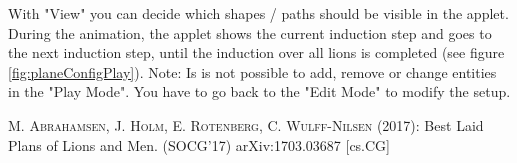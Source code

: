 \documentclass[a4paper]{article}
\begin{document}
With "View" you can decide which shapes / paths should be visible in the applet. During the animation, the applet shows the current induction step and goes to the next induction step, until the induction over all lions is completed (see figure \ref{fig:planeConfigPlay}). Note: Is is not possible to add, remove or change entities in the "Play Mode". You have to go back to the "Edit Mode" to modify the setup.



\newpage
	\begin{thebibliography}{99}
		
		
		 \textsc{M. Abrahamsen, J. Holm, E. Rotenberg, C. Wulff-Nilsen} (2017): Best Laid Plans of Lions and Men. (SOCG'17) arXiv:1703.03687 [cs.CG]

	

		
	\end{thebibliography} 
\end{document}
